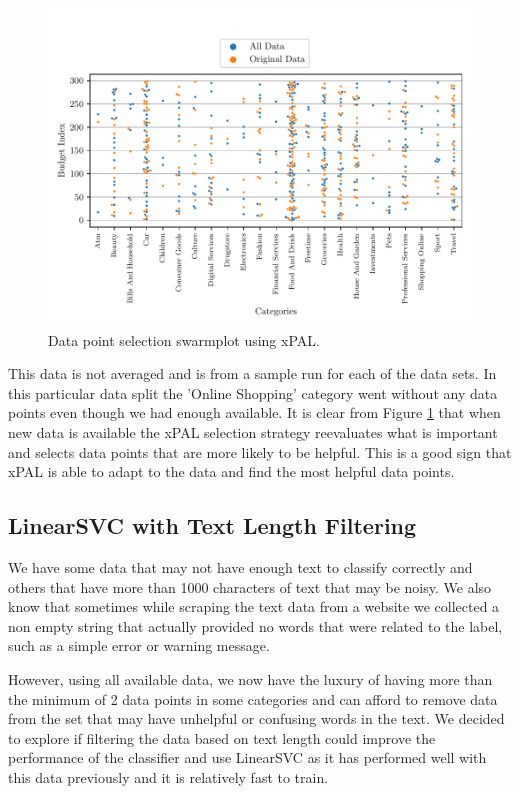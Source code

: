 \begin{figure}[h]
  \centering
  \includegraphics[width=\textwidth]{../img/plot_xpal_selection_dist.pdf}
  \caption{Data point selection swarmplot using xPAL.}
  \label{fig:xpal_data_selection}
\end{figure}

This data is not averaged and is from a sample run for each of the data sets. In this particular data split the 'Online Shopping' category went without any data points even though we had enough available. It is clear from Figure \ref{fig:xpal_data_selection} that when new data is available the xPAL selection strategy reevaluates what is important and selects data points that are more likely to be helpful. This is a good sign that xPAL is able to adapt to the data and find the most helpful data points.

\subsection{LinearSVC with Text Length Filtering} 

We have some data that may not have enough text to classify correctly and others that have more than 1000 characters of text that may be noisy. We also know that sometimes while scraping the text data from a website we collected a non empty string that actually provided no words that were related to the label, such as a simple error or warning message.

However, using all available data, we now have the luxury of having more than the minimum of 2 data points in some categories and can afford to remove data from the set that may have unhelpful or confusing words in the text. We decided to explore if filtering the data based on text length could improve the performance of the classifier and use LinearSVC as it has performed well with this data previously and it is relatively fast to train.

